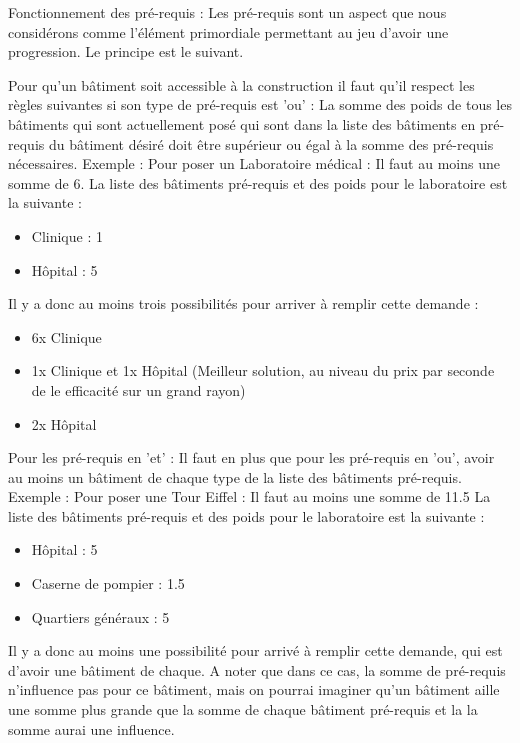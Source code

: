 \documentclass[a4paper,10pt,openany,oneside]{report}
\begin{document}
Fonctionnement des pré-requis :
Les pré-requis sont un aspect que nous considérons comme l'élément primordiale permettant au jeu d'avoir une progression. Le principe est le suivant.

Pour qu'un bâtiment soit accessible à la construction il faut qu'il respect les règles suivantes si son type de pré-requis est 'ou' :
La somme des poids de tous les bâtiments qui sont actuellement posé qui sont dans la liste des bâtiments en pré-requis du bâtiment désiré doit être supérieur ou égal à la somme des pré-requis nécessaires.
Exemple :
Pour poser un Laboratoire médical : Il faut au moins une somme de 6.
La liste des bâtiments pré-requis et des poids pour le laboratoire est la suivante :
\begin{itemize}
	\item Clinique : 1
	\item Hôpital : 5
\end{itemize}
Il y a donc au moins trois possibilités pour arriver à remplir cette demande :
\begin{itemize}
	\item 6x Clinique
	\item 1x Clinique et 1x Hôpital (Meilleur solution, au niveau du prix par seconde de le efficacité sur un grand rayon)
	\item 2x Hôpital
\end{itemize}

Pour les pré-requis en 'et' :
Il faut en plus que pour les pré-requis en 'ou', avoir au moins un bâtiment de chaque type de la liste des bâtiments pré-requis.
Exemple :
Pour poser une Tour Eiffel : Il faut au moins une somme de 11.5
La liste des bâtiments pré-requis et des poids pour le laboratoire est la suivante :
\begin{itemize}
	\item Hôpital : 5
	\item Caserne de pompier : 1.5
	\item Quartiers généraux : 5
\end{itemize}
Il y a donc au moins une possibilité pour arrivé à remplir cette demande, qui est d'avoir une bâtiment de chaque. A noter que dans ce cas, la somme de pré-requis n'influence pas pour ce bâtiment, mais on pourrai imaginer qu'un bâtiment aille une somme plus grande que la somme de chaque bâtiment pré-requis et la la somme aurai une influence.
\end{document}
